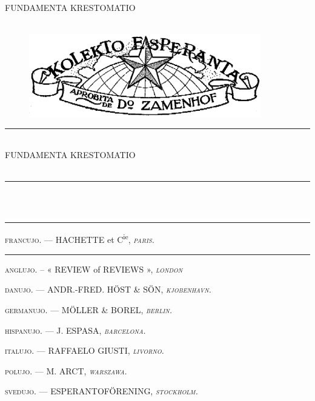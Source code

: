 \documentclass[a5paper,11pt,openany,twoside]{book}
\begin{document}
\frontmatter

%
%
\vspace*{\fill}
\begin{center}
\nicefont
 {\LARGE FUNDAMENTA KRESTOMATIO}\\[0.8cm]
 {\large {}}\\[0.8cm]
 {}
\end{center}
\vspace*{\fill}
\cleardoublepage

%
%
\thispagestyle{empty}
\begin{center}
 \begin{figure}[!ht]
 \centering \includegraphics[width=0.9\textwidth]{terglobo.png}
 \end{figure}
 \nicefont
 
 {\large {}}

 \rule{13mm}{0.4pt}\\[1cm]

 {\LARGE FUNDAMENTA KRESTOMATIO}\\[0.8cm]
 {}\\[0.8cm]
 {}


 \rule[0.5ex]{13mm}{0.4pt} \\
 {\small {}}\\
 \rule[0.7ex]{13mm}{0.4pt}


\csfont \footnotesize

\textsc{francujo.} — HACHETTE et C\textsuperscript{ie}, \textsc{\textit{paris.}}

\rule[0.9ex]{13mm}{0.4pt}

\textsc{anglujo.} – « REVIEW of REVIEWS », \textsc{\textit{london}}

\textsc{danujo.} — ANDR.-FRED. HÖST \& SÖN, \textsc{\textit{kjobenhavn.}}

\textsc{germanujo.} — MÖLLER \& BOREL, \textsc{\textit{berlin.}}

\textsc{hispanujo.} — J. ESPASA, \textsc{\textit{barcelona.}}

\textsc{italujo.} — RAFFAELO GIUSTI, \textsc{\textit{livorno.}}

\textsc{polujo.} — M. ARCT, \textsc{\textit{warszawa.}}

\textsc{svedujo.} — ESPERANTOFÖRENING, \textsc{\textit{stockholm.}}

\end{center}
 
\end{document}
